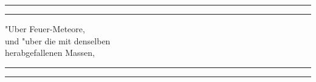 \documentclass[a4paper, 11pt, oneside, polutonikogreek, german]{article}
\begin{document}
\frakfamily
\renewcommand{\contentsname}{
\frakfamily{Inhaltsverzeichnis}
}
\let\origcftsecfont\cft
\let\origcftsecpagefont\cftsecpagefont
\let\origcftsecafterpnum\cftsecafterpnum
\renewcommand{\cftsecpagefont}{\frakfamily{\origcftsecpagefont}}
\renewcommand{\cftsecafterpnum}{\frakfamily{\origcftsecafterpnum}}
\let\origcftsubsecpagefont\cftsubsecpagefont
\let\origcftsubsecafterpnum\cftsubsecafterpnum
\renewcommand{\cftsubsecpagefont}{\frakfamily{\origcftsubsecpagefont}}
\renewcommand{\cftsubsecafterpnum}{\frakfamily{\origcftsubsecafterpnum}}
\let\origcftsubsubsecpagefont\cftsubsubsecpagefont
\let\origcftsubsubsecafterpnum\cftsubsubsecafterpnum
\renewcommand{\cftsubsubsecpagefont}{\frakfamily{\origcftsubsubsecpagefont}}
\renewcommand{\cftsubsubsecafterpnum}{\frakfamily{\origcftsubsubsecafterpnum}}
\begin{titlepage} %
	\centering %

	
	\rule{\textwidth}{1.6pt}\vspace*{-\baselineskip}\vspace*{2pt} %
	\rule{\textwidth}{0.4pt} %
	
	\vspace{1\baselineskip} %
	
	{\huge "Uber Feuer-Meteore,\\[1.25pt] und "uber die mit denselben\\[1.25pt] herabgefallenen Massen,\\[1.25pt]}
	
	\vspace{1\baselineskip} %

	\rule{\textwidth}{0.4pt}\vspace*{-\baselineskip}\vspace{3.2pt} %
	\rule{\textwidth}{1.6pt} %
	
	\vspace{1\baselineskip} %
	
	

\end{titlepage}
\end{document}
